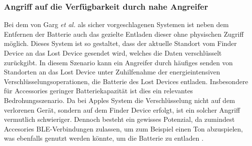\subsubsection{Angriff auf die Verfügbarkeit durch nahe Angreifer}
Bei dem von Garg \textit{et al.} \cite{Garg_Secure_Tracker} als sicher vorgeschlagenen Systemen ist neben dem Entfernen der Batterie auch das gezielte Entladen dieser ohne physischen Zugriff möglich.
Dieses System ist so gestaltet, dass der aktuelle Standort vom Finder Device an das Lost Device gesendet wird, welches die Daten verschlüsselt zurückgibt.
In diesem Szenario kann ein Angreifer durch häufiges senden von Standorten an das Lost Device unter Zuhilfenahme der energieintensiven Verschlüsselungsoperationen, die Batterie des Lost Devices entladen.
Insbesondere für Accessories geringer Batteriekapazität ist dies ein relevantes Bedrohungsszenario.
Da bei Apples System die Verschlüsselung nicht auf dem verlorenen Gerät, sondern auf dem Finder Device erfolgt, ist ein solcher Angriff vermutlich schwieriger.
Dennoch besteht ein gewisses Potenzial, da zumindest Accesories \ac{BLE}-Verbindungen zulassen, um zum Beispiel einen Ton abzuspielen, was ebenfalls genutzt werden könnte, um die Batterie zu entladen \cite{Apple_FindMySpec}.


